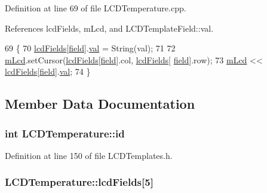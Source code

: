 Definition at line 69 of file L\-C\-D\-Temperature.\-cpp.



References lcd\-Fields, m\-Lcd, and L\-C\-D\-Template\-Field\-::val.


\begin{DoxyCode}
69                                                      \{
70   \hyperlink{class_l_c_d_temperature_a933b7d2e4de573cc08de1d76b6779259}{lcdFields}[\hyperlink{_l_c_d_templates_8h_a20a49e010fbfc3a43959f12d92e01bb6}{field}].\hyperlink{struct_l_c_d_template_field_a6eb7ce0547fc28ac3a2538f0fac3f117}{val} = String(val);
71 
72   \hyperlink{class_l_c_d_temperature_a6619ac859b70619851329ee8b8eda15d}{mLcd}.setCursor(\hyperlink{class_l_c_d_temperature_a933b7d2e4de573cc08de1d76b6779259}{lcdFields}[\hyperlink{struct_l_c_d_template_field}{field}].col, \hyperlink{class_l_c_d_temperature_a933b7d2e4de573cc08de1d76b6779259}{lcdFields}[
      \hyperlink{struct_l_c_d_template_field}{field}].row);
73   \hyperlink{class_l_c_d_temperature_a6619ac859b70619851329ee8b8eda15d}{mLcd} << \hyperlink{class_l_c_d_temperature_a933b7d2e4de573cc08de1d76b6779259}{lcdFields}[\hyperlink{_l_c_d_templates_8h_a20a49e010fbfc3a43959f12d92e01bb6}{field}].\hyperlink{struct_l_c_d_template_field_a6eb7ce0547fc28ac3a2538f0fac3f117}{val};
74 \}
\end{DoxyCode}


\subsection{Member Data Documentation}
\hypertarget{class_l_c_d_temperature_a9283508ad2db7e2b155421e8a046682a}{
\subsubsection[{id}]{\setlength{\rightskip}{0pt plus 5cm}int L\-C\-D\-Temperature\-::id}}\label{class_l_c_d_temperature_a9283508ad2db7e2b155421e8a046682a}


Definition at line 150 of file L\-C\-D\-Templates.\-h.

\hypertarget{class_l_c_d_temperature_a933b7d2e4de573cc08de1d76b6779259}{
\subsubsection[{lcd\-Fields}]{ L\-C\-D\-Temperature\-::lcd\-Fields\mbox{[}5\mbox{]}}}\label{class_l_c_d_temperature_a933b7d2e4de573cc08de1d76b6779259}


